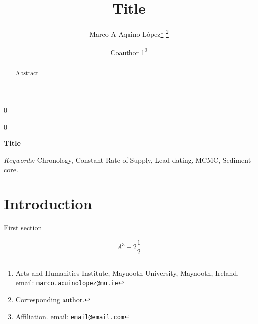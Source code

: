 \documentclass[12pt]{article}
\date{ }
\newcommand{\blind}{0}
\newcommand{\papertitle}{Title}
\begin{document}
	\def\spacingset#1{\renewcommand{\baselinestretch}%
		{#1}\small\normalsize} \spacingset{1}    
	\blind
	{
		\title{\textbf{\papertitle}}
		
		\author{Marco A Aquino-L\'opez\thanks{				Arts and Humanities Institute, 
				Maynooth University, 
				Maynooth, Ireland.
				email: \texttt{marco.aquinolopez@mu.ie}} \thanks{Corresponding author.}  
					\and
			Coauthor 1\thanks{
				Affiliation.
				email: \texttt{email@email.com}} 

			}
		\maketitle
	} \fi
	
	\blind
	{
		\bigskip
		\bigskip
		\bigskip
		\begin{center}
			{\LARGE\bf \papertitle}
		\end{center}
		\medskip
	} \fi
	
	\bigskip
\begin{abstract}
Abstract 
\end{abstract}	
	\noindent%
	{\it Keywords:} Chronology, Constant Rate of Supply, Lead dating, MCMC, Sediment core.
	\vfill	
	\newpage
	\spacingset{1.45} %

\section{Introduction}
First section \cite{christen2009}


$$A^3+2 \frac{1}{2}$$






\end{document}
